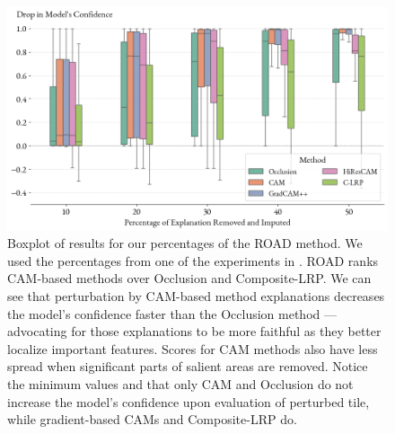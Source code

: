 \begin{figure}
    \centering
      \includegraphics[width=\textwidth]{img/road-boxplot.png}
    \caption{
    Boxplot of results for our percentages of the ROAD method.
    We used the percentages from one of the experiments in \cite{road}.
    ROAD ranks CAM-based methods over Occlusion and Composite-LRP.
    We can see that perturbation by CAM-based method explanations decreases the model's confidence faster than the Occlusion method --- advocating for those explanations to be more faithful as they better localize important features.
    Scores for CAM methods also have less spread when significant parts of salient areas are removed.
    Notice the minimum values and that only CAM and Occlusion do not increase the model's confidence upon evaluation of perturbed tile, while gradient-based CAMs and Composite-LRP do.
    }
    \label{fig:road-boxplot}
\end{figure}

